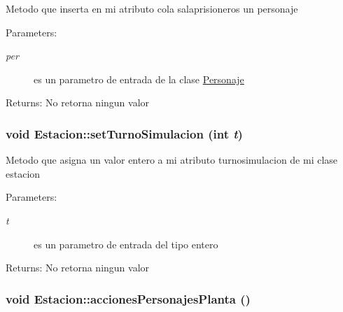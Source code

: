 Metodo que inserta en mi atributo cola salaprisioneros un personaje \begin{Desc}
\item[Parameters:]
\begin{description}
\item[{\em per}]es un parametro de entrada de la clase \hyperlink{classPersonaje}{Personaje} \end{description}
\end{Desc}
\begin{Desc}
\item[Returns:]No retorna ningun valor \end{Desc}
\hypertarget{classEstacion_61418af028ef6a48d6ccdd125cd739d6}{
\subsubsection[setTurnoSimulacion]{\setlength{\rightskip}{0pt plus 5cm}void Estacion::setTurnoSimulacion (int {\em t})}}
\label{classEstacion_61418af028ef6a48d6ccdd125cd739d6}


Metodo que asigna un valor entero a mi atributo turnosimulacion de mi clase estacion \begin{Desc}
\item[Parameters:]
\begin{description}
\item[{\em t}]es un parametro de entrada del tipo entero \end{description}
\end{Desc}
\begin{Desc}
\item[Returns:]No retorna ningun valor \end{Desc}
\hypertarget{classEstacion_d0ea7dfe20aa29bf0dfc984849fbab1f}{
\subsubsection[accionesPersonajesPlanta]{\setlength{\rightskip}{0pt plus 5cm}void Estacion::accionesPersonajesPlanta ()}}
\label{classEstacion_d0ea7dfe20aa29bf0dfc984849fbab1f}


